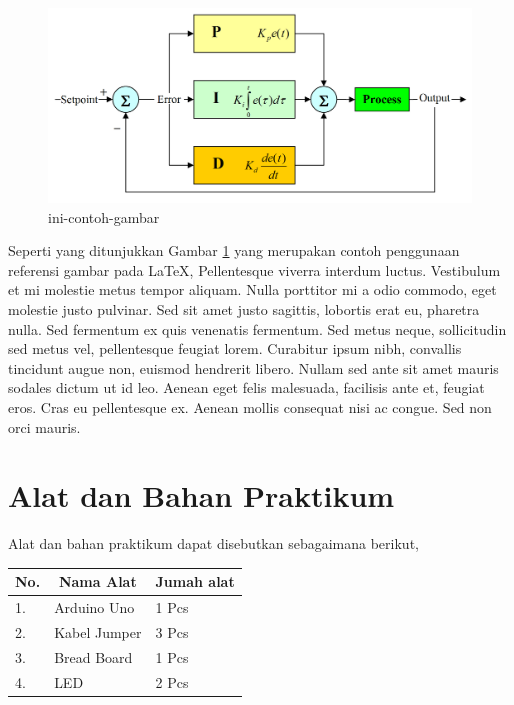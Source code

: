 \documentclass[12 pt]{article}
\begin{document}
\begin{figure}[H]
    \centering
    \includegraphics[width = \textwidth]{gambar_praktikum/gambar_pid.png}
    \caption{ini-contoh-gambar}
    \label{ini-label-gambar}
\end{figure}

Seperti yang ditunjukkan Gambar \ref{ini-label-gambar} yang merupakan contoh penggunaan referensi gambar pada \LaTeX, Pellentesque viverra interdum luctus. Vestibulum et mi molestie metus tempor aliquam. Nulla porttitor mi a odio commodo, eget molestie justo pulvinar. Sed sit amet justo sagittis, lobortis erat eu, pharetra nulla. Sed fermentum ex quis venenatis fermentum. Sed metus neque, sollicitudin sed metus vel, pellentesque feugiat lorem. Curabitur ipsum nibh, convallis tincidunt augue non, euismod hendrerit libero. Nullam sed ante sit amet mauris sodales dictum ut id leo. Aenean eget felis malesuada, facilisis ante et, feugiat eros. Cras eu pellentesque ex. Aenean mollis consequat nisi ac congue. Sed non orci mauris.

\section{Alat dan Bahan Praktikum}

Alat dan bahan praktikum dapat disebutkan sebagaimana berikut,

\begin{table}[H]
\centering
\begin{tabular}{lll}
\hline
\multicolumn{1}{c}{No.} & \multicolumn{1}{c}{Nama Alat} & \multicolumn{1}{c}{Jumah alat} \\ \hline
1.                      & Arduino Uno                   & 1 Pcs                          \\
2.                      & Kabel Jumper                  & 3 Pcs                          \\
3.                      & Bread Board                   & 1 Pcs                          \\
4.                      & LED                           & 2 Pcs                         
\end{tabular}
\end{table}
\end{document}
